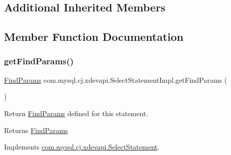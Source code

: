 \subsection*{Additional Inherited Members}


\subsection{Member Function Documentation}
\mbox{\label{classcom_1_1mysql_1_1cj_1_1xdevapi_1_1_select_statement_impl_a887ea3a5dcdb37d2bc6845cfc67631a9}} 
\subsubsection{\texorpdfstring{get\+Find\+Params()}{getFindParams()}}
{\footnotesize\ttfamily \mbox{\hyperlink{interfacecom_1_1mysql_1_1cj_1_1xdevapi_1_1_find_params}{Find\+Params}} com.\+mysql.\+cj.\+xdevapi.\+Select\+Statement\+Impl.\+get\+Find\+Params (\begin{DoxyParamCaption}{ }\end{DoxyParamCaption})}

Return \mbox{\hyperlink{interfacecom_1_1mysql_1_1cj_1_1xdevapi_1_1_find_params}{Find\+Params}} defined for this statement.

\begin{DoxyReturn}{Returns}
\mbox{\hyperlink{interfacecom_1_1mysql_1_1cj_1_1xdevapi_1_1_find_params}{Find\+Params}} 
\end{DoxyReturn}


Implements \mbox{\hyperlink{interfacecom_1_1mysql_1_1cj_1_1xdevapi_1_1_select_statement_aba9e71159f41003a6514960d37e4021b}{com.\+mysql.\+cj.\+xdevapi.\+Select\+Statement}}.

\mbox{\label{classcom_1_1mysql_1_1cj_1_1xdevapi_1_1_select_statement_impl_a88dd14474574f8e6f785aa2341b7c382}} 
